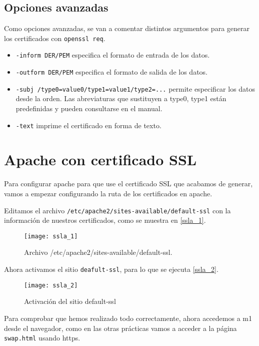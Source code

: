 \section{Opciones avanzadas}

Como opciones avanzadas, se van a comentar distintos argumentos para generar los certificados con \verb|openssl req|.

\begin{itemize}
\item \verb|-inform DER/PEM| especifica el formato de entrada de los datos.
\item \verb|-outform DER/PEM| especifica el formato de salida de los datos.
\item \verb|-subj /type0=value0/type1=value1/type2=...| permite especificar los datos desde la orden. Las abreviaturas que sustituyen a type0, type1 están predefinidas y pueden consultarse en el manual.
\item \verb|-text| imprime el certificado en forma de texto.
\end{itemize}


\chapter{Apache con certificado SSL}

Para configurar apache para que use el certificado SSL que acabamos de generar, vamos a empezar configurando la ruta de los certificados en apache.

Editamos el archivo \verb|/etc/apache2/sites-available/default-ssl| con la información de nuestros certificados, como se muestra en \eqref{ssla_1}.

\begin{figure}[h!]
\begin{center}
\caption{Archivo /etc/apache2/sites-available/default-ssl.}
\label{ssla_1}
\texttt{[image: ssla\_1]}
\end{center}
\end{figure}

Ahora activamos el sitio \verb|deafult-ssl|, para lo que se ejecuta \eqref{ssla_2}.

\begin{figure}[h!]
\begin{center}
\caption{Activación del sitio default-ssl}
\label{ssla_2}
\texttt{[image: ssla\_2]}
\end{center}
\end{figure}

Para comprobar que hemos realizado todo correctamente, ahora accedemos a m1 desde el navegador, como en las otras prácticas vamos a acceder a la página \verb|swap.html| usando https.

